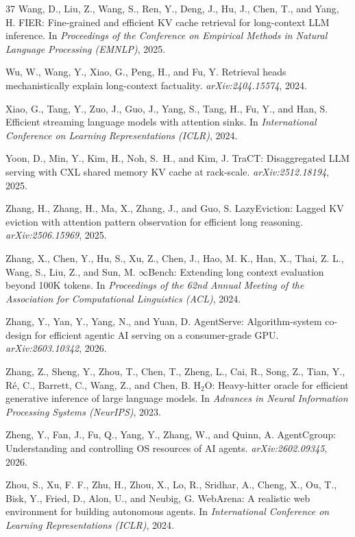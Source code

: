 \documentclass{article}
\begin{document}
\begin{thebibliography}{37}
Wang, D., Liu, Z., Wang, S., Ren, Y., Deng, J., Hu, J., Chen, T., and
  Yang, H.
\newblock FIER: Fine-grained and efficient KV cache retrieval for
  long-context LLM inference.
\newblock In \emph{Proceedings of the Conference on Empirical Methods in
  Natural Language Processing (EMNLP)}, 2025.

Wu, W., Wang, Y., Xiao, G., Peng, H., and Fu, Y.
\newblock Retrieval heads mechanistically explain long-context factuality.
\newblock \emph{arXiv:2404.15574}, 2024.

Xiao, G., Tang, Y., Zuo, J., Guo, J., Yang, S., Tang, H., Fu, Y.,
  and Han, S.
\newblock Efficient streaming language models with attention sinks.
\newblock In \emph{International Conference on Learning Representations
  (ICLR)}, 2024.

Yoon, D., Min, Y., Kim, H., Noh, S.~H., and Kim, J.
\newblock TraCT: Disaggregated LLM serving with CXL shared memory KV cache at rack-scale.
\newblock \emph{arXiv:2512.18194}, 2025.

Zhang, H., Zhang, H., Ma, X., Zhang, J., and Guo, S.
\newblock LazyEviction: Lagged KV eviction with attention pattern
  observation for efficient long reasoning.
\newblock \emph{arXiv:2506.15969}, 2025.

Zhang, X., Chen, Y., Hu, S., Xu, Z., Chen, J., Hao, M. K., Han, X.,
  Thai, Z. L., Wang, S., Liu, Z., and Sun, M.
\newblock $\infty$Bench: Extending long context evaluation beyond 100K
  tokens.
\newblock In \emph{Proceedings of the 62nd Annual Meeting of the
  Association for Computational Linguistics (ACL)}, 2024.

Zhang, Y., Yan, Y., Yang, N., and Yuan, D.
\newblock AgentServe: Algorithm-system co-design for efficient agentic
  AI serving on a consumer-grade GPU.
\newblock \emph{arXiv:2603.10342}, 2026.

Zhang, Z., Sheng, Y., Zhou, T., Chen, T., Zheng, L., Cai, R., Song, Z.,
  Tian, Y., R{\'e}, C., Barrett, C., Wang, Z., and Chen, B.
\newblock H$_2$O: Heavy-hitter oracle for efficient generative inference
  of large language models.
\newblock In \emph{Advances in Neural Information Processing Systems
  (NeurIPS)}, 2023.

Zheng, Y., Fan, J., Fu, Q., Yang, Y., Zhang, W., and Quinn, A.
\newblock AgentCgroup: Understanding and controlling OS resources of AI
  agents.
\newblock \emph{arXiv:2602.09345}, 2026.

Zhou, S., Xu, F. F., Zhu, H., Zhou, X., Lo, R., Sridhar, A.,
  Cheng, X., Ou, T., Bisk, Y., Fried, D., Alon, U., and Neubig, G.
\newblock WebArena: A realistic web environment for building autonomous
  agents.
\newblock In \emph{International Conference on Learning
  Representations (ICLR)}, 2024.

\end{thebibliography}
\end{document}
